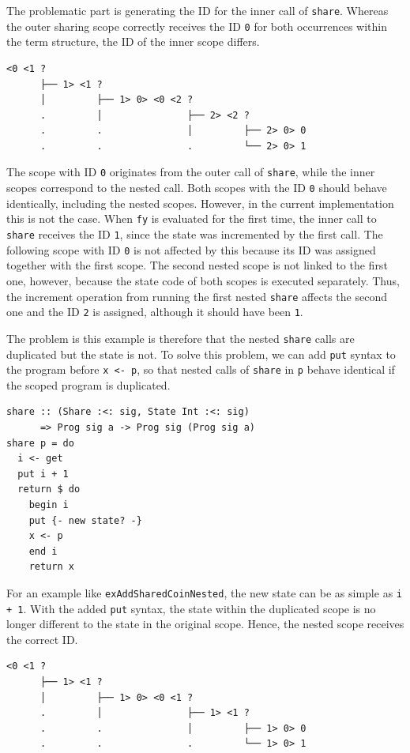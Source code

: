 \documentclass[a4paper, 11pt, fleqn, twoside]{scrreprt}
\newcommand{\hinl}[1]{\texttt{#1}}
\begin{document}
The problematic part is generating the ID for the inner call of \hinl{share}.
Whereas the outer sharing scope correctly receives the ID \hinl{0} for both occurrences within the term structure, the ID of the inner scope differs.

\begin{verbatim}
<0 <1 ? 
      ├── 1> <1 ? 
      │         ├── 1> 0> <0 <2 ? 
      .         │               ├── 2> <2 ? 
      .         .               │         ├── 2> 0> 0
      .         .               .         └── 2> 0> 1
\end{verbatim}

The scope with ID \hinl{0} originates from the outer call of \hinl{share}, while the inner scopes correspond to the nested call.
Both scopes with the ID \hinl{0} should behave identically, including the nested scopes.
However, in the current implementation this is not the case.
When \hinl{fy} is evaluated for the first time, the inner call to \hinl{share} receives the ID \hinl{1}, since the state was incremented by the first call.
The following scope with ID \hinl{0} is not affected by this because its ID was assigned together with the first scope.
The second nested scope is not linked to the first one, however, because the state code of both scopes is executed separately.
Thus, the increment operation from running the first nested \hinl{share} affects the second one and the ID \hinl{2} is assigned, although it should have been \hinl{1}.

The problem is this example is therefore that the nested \hinl{share} calls are duplicated but the state is not.
To solve this problem, we can add \hinl{put} syntax to the program before \hinl{x <- p}, so that  nested calls of \hinl{share} in \hinl{p} behave identical if the scoped program is duplicated.

\begin{verbatim}
share :: (Share :<: sig, State Int :<: sig) 
      => Prog sig a -> Prog sig (Prog sig a)
share p = do
  i <- get
  put i + 1
  return $ do
    begin i
    put {- new state? -}
    x <- p
    end i
    return x
\end{verbatim}

For an example like \hinl{exAddSharedCoinNested}, the new state can be as simple as \hinl{i + 1}.
With the added \hinl{put} syntax, the state within the duplicated scope is no longer different to the state in the original scope.
Hence, the nested scope receives the correct ID.

\begin{verbatim}
<0 <1 ? 
      ├── 1> <1 ? 
      │         ├── 1> 0> <0 <1 ? 
      .         │               ├── 1> <1 ? 
      .         .               │         ├── 1> 0> 0
      .         .               .         └── 1> 0> 1
\end{verbatim}
\end{document}
